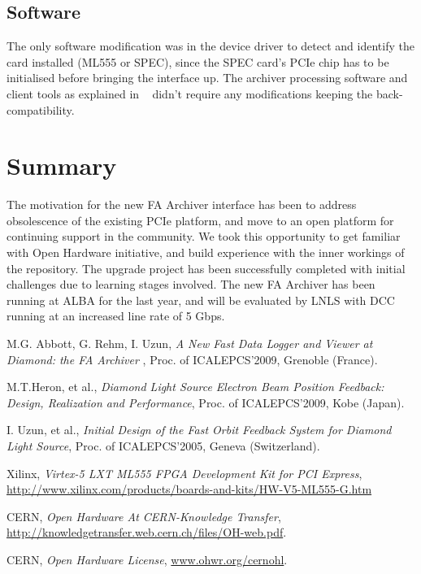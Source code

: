 \documentclass[a4paper,
              ]{jacow}
\begin{document}
\subsection{Software}
The only software modification was in the device driver to detect and identify the card installed (ML555 or SPEC), since the SPEC card's PCIe chip has to be initialised before bringing the interface up. The archiver processing software and client tools as explained in ~\cite{ARCHIVER} didn't require any modifications keeping the back-compatibility.

\section{Summary}
\balance
The motivation for the new FA Archiver interface has been to address obsolescence of the existing PCIe platform, and move to an open platform for continuing support in the community. We took this opportunity to get familiar with Open Hardware initiative, and build experience with the inner workings of the repository. The upgrade project has been successfully completed with initial challenges due to learning stages involved. The new FA Archiver has been running at ALBA for the last year, and will be evaluated by LNLS with DCC running at an increased line rate of 5 Gbps.

\iffalse  %
	\newpage
	\printbibliography

\else

\begin{thebibliography}{9} %

M.G. Abbott, G. Rehm, I. Uzun, {\it A New Fast Data Logger and Viewer at Diamond: the FA Archiver }, Proc. of ICALEPCS'2009, Grenoble (France).

M.T.Heron, et al., {\it Diamond Light Source Electron Beam Position Feedback: Design, Realization and Performance}, Proc. of ICALEPCS'2009, Kobe (Japan). 

I. Uzun, et al., {\it Initial Design of the Fast Orbit Feedback System for Diamond Light Source}, 
Proc. of ICALEPCS'2005, Geneva (Switzerland). 

Xilinx, {\it Virtex-5 LXT ML555 FPGA Development Kit for PCI Express}, \url{http://www.xilinx.com/products/boards-and-kits/HW-V5-ML555-G.htm}

CERN, {\it Open Hardware At CERN-Knowledge Transfer}, \url{http://knowledgetransfer.web.cern.ch/files/OH-web.pdf}.

CERN, {\it Open Hardware License}, \url{www.ohwr.org/cernohl}.

\end{thebibliography}
\vspace{10mm}
\fi
\end{document}
